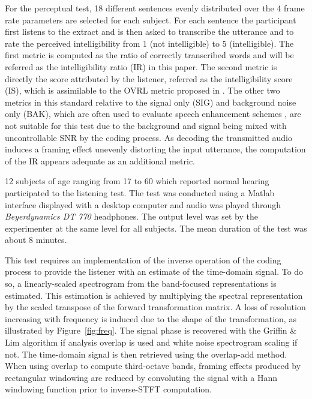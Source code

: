 \documentclass[sensors,article,submit,moreauthors,pdftex,10pt,a4paper]{mdpi}
\begin{document}
For the perceptual test, 18 different sentences evenly distributed over the 4 frame rate parameters are selected for each subject. For each sentence the participant first listens to the extract and is then asked to transcribe the utterance and to rate the perceived intelligibility from 1 (not intelligible) to 5 (intelligible). The first metric is computed as the ratio of correctly transcribed words and will be referred as the intelligibility ratio (IR) in this paper. The second metric is directly the score attributed by the listener, referred as the intelligibility score (IS), which is assimilable to the OVRL metric proposed in \cite{itup835}. The other two metrics in this standard relative to the signal only (SIG) and background noise only (BAK), which are often used to evaluate speech enhancement schemes \citep{ntalampiras2008}, are not suitable for this test due to the background and signal being mixed with uncontrollable SNR by the coding process. As decoding the transmitted audio induces a framing effect unevenly distorting the input utterance, the computation of the IR appears adequate as an additional metric.

12 subjects of age ranging from 17 to 60 which reported normal hearing participated to the listening test. The test was conducted using a Matlab interface displayed with a desktop computer and audio was played through \textit{Beyerdynamics DT 770} headphones. The output level was set by the experimenter at the same level for all subjects. The mean duration of the test was about 8 minutes.

This test requires an implementation of the inverse operation of the coding process to provide the listener with an estimate of the time-domain signal. To do so, a linearly-scaled spectrogram from the band-focused representations is estimated. This estimation is achieved by multiplying the spectral representation by the scaled transpose of the forward transformation matrix. A loss of resolution increasing with frequency is induced due to the shape of the transformation, as illustrated by Figure~\ref{fig:freq}. The signal phase is recovered with the Griffin \& Lim algorithm \cite{griffin1984} if analysis overlap is used and white noise spectrogram scaling if not. The time-domain signal is then retrieved using the overlap-add method. When using overlap to compute third-octave bands, framing effects produced by rectangular windowing are reduced by convoluting the signal with a Hann windowing function prior to inverse-STFT computation.
\end{document}
